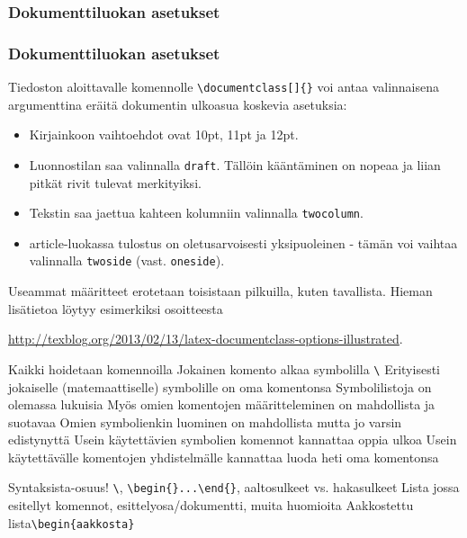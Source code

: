 \subsubsection{Dokumenttiluokan asetukset}
\begin{frame}[fragile]
    \frametitle{Dokumenttiluokan asetukset}
    Tiedoston aloittavalle komennolle \verb-\documentclass[]{}- voi antaa valinnaisena argumenttina eräitä dokumentin ulkoasua koskevia asetuksia:
    \begin{itemize}
        \item Kirjainkoon vaihtoehdot ovat 10pt, 11pt ja 12pt. 
        \item Luonnostilan saa valinnalla \verb-draft-. Tällöin kääntäminen on nopeaa ja liian pitkät rivit tulevat merkityiksi.
        \item Tekstin saa jaettua kahteen kolumniin valinnalla \verb-twocolumn-. 
        \item article-luokassa tulostus on oletusarvoisesti yksipuoleinen - tämän voi vaihtaa valinnalla \verb-twoside- (vast. \verb-oneside-).
    \end{itemize}
    Useammat määritteet erotetaan toisistaan pilkuilla, kuten tavallista.
    \vaihto
    Hieman lisätietoa löytyy esimerkiksi osoitteesta \begin{scriptsize}
        \url{http://texblog.org/2013/02/13/latex-documentclass-options-illustrated}.
    \end{scriptsize}
\end{frame}
%
%
%


Kaikki hoidetaan komennoilla
Jokainen komento alkaa symbolilla \verb+\+
Erityisesti jokaiselle (matemaattiselle) symbolille on oma komentonsa
Symbolilistoja on olemassa lukuisia
Myös omien komentojen määritteleminen on mahdollista ja suotavaa
Omien symbolienkin luominen on mahdollista mutta jo varsin edistynyttä
Usein käytettävien symbolien komennot kannattaa oppia ulkoa
Usein käytettävälle komentojen yhdistelmälle kannattaa luoda heti oma komentonsa

Syntaksista-osuus! \verb-\-, \verb-\begin{}...\end{}-, aaltosulkeet vs. hakasulkeet
    Lista jossa esitellyt komennot, esittelyosa/dokumentti, muita huomioita
    Aakkostettu lista\verb-\begin{aakkosta}-

